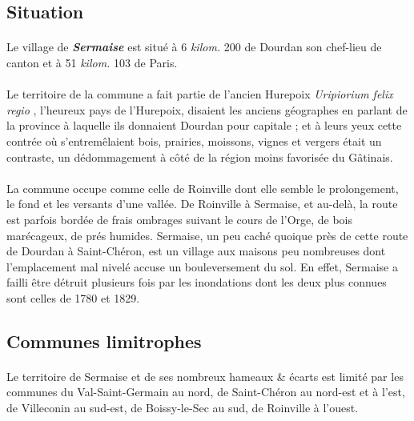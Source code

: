 \documentclass[../eBook.tex]{subfiles}
\begin{document}
  \subsection*{Situation}
    \paragraph{}Le village de \textit{\textbf{Sermaise}} est situé à 6 \textit{kilom.} 200 de Dourdan son chef-lieu de canton et à 51 \textit{kilom.} 103 de Paris.
    \paragraph{}Le territoire de la commune a fait partie de l'ancien Hurepoix \og \textit{Uripiorium felix regio} \fg{}, l'heureux pays de l'Hurepoix, disaient les anciens géographes en parlant de la province à laquelle ils donnaient Dourdan pour capitale ; et à leurs yeux cette contrée où s'entremêlaient bois, prairies, moissons, vignes et vergers était un contraste, un dédommagement à côté de la région moins favorisée du Gâtinais.
    \paragraph{}La commune occupe comme celle de Roinville dont elle semble le prolongement, le fond et les versants d'une vallée. De Roinville à Sermaise, et au-delà, la route est parfois bordée de frais ombrages suivant le cours de l'Orge, de bois marécageux, de prés humides. Sermaise, un peu caché quoique près de cette route de Dourdan à Saint-Chéron, est un village aux maisons peu nombreuses dont l'emplacement mal nivelé accuse un bouleversement du sol. En effet, Sermaise a failli être détruit plusieurs fois par les inondations dont les deux plus connues sont celles de 1780 et 1829.

  \subsection*{Communes limitrophes}
    \paragraph{}Le territoire de Sermaise et de ses nombreux hameaux \&  écarts est limité par les communes du Val-Saint-Germain au nord, de Saint-Chéron au nord-est et à l'est, de Villeconin au sud-est, de Boissy-le-Sec au sud, de Roinville à l'ouest.
\end{document}
